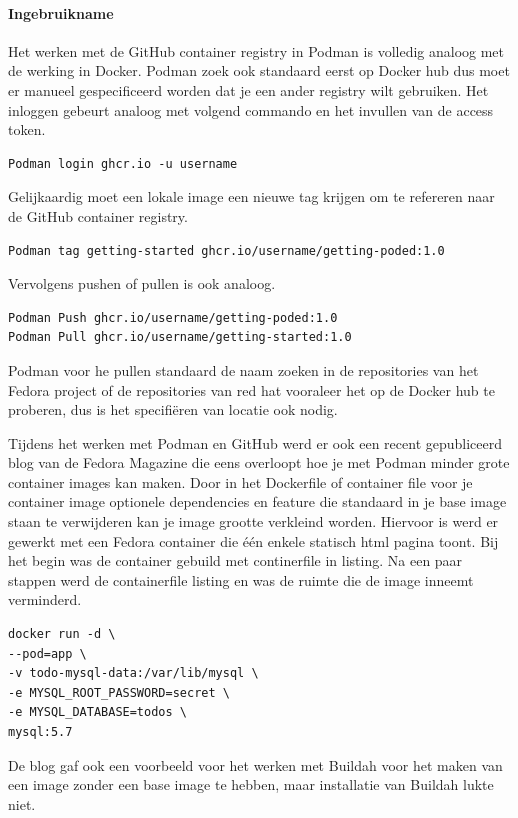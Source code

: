 \paragraph{Ingebruikname}
Het werken met de GitHub container registry in Podman is volledig analoog met de werking in Docker. Podman zoek ook standaard eerst op Docker hub dus moet er manueel gespecificeerd worden dat je een ander registry wilt gebruiken. Het inloggen gebeurt analoog met volgend commando en het invullen van de access token.
\begin{verbatim}
Podman login ghcr.io -u username
\end{verbatim}

Gelijkaardig moet een lokale image een nieuwe tag krijgen om te refereren naar de GitHub container registry.
\begin{verbatim}
Podman tag getting-started ghcr.io/username/getting-poded:1.0
\end{verbatim}

Vervolgens pushen of pullen is ook analoog.
\begin{verbatim}
Podman Push ghcr.io/username/getting-poded:1.0
Podman Pull ghcr.io/username/getting-started:1.0
\end{verbatim}

Podman voor he pullen standaard de naam zoeken in de repositories van het Fedora project of de repositories van red hat vooraleer het op de Docker hub te proberen, dus is het specifiëren van locatie ook nodig.

Tijdens het werken met Podman en GitHub werd er ook een recent gepubliceerd blog van de Fedora Magazine die eens overloopt hoe je met Podman minder grote container images kan maken. Door in het Dockerfile of container file voor je container image optionele dependencies en feature die standaard in je base image staan te verwijderen kan je image grootte verkleind worden. Hiervoor is werd er gewerkt met een Fedora container die één enkele statisch html pagina toont. Bij het begin was de container gebuild met continerfile in listing. Na een paar stappen werd de containerfile listing en was de ruimte die de image inneemt verminderd.
\begin{lstlisting}
docker run -d \
--pod=app \
-v todo-mysql-data:/var/lib/mysql \
-e MYSQL_ROOT_PASSWORD=secret \
-e MYSQL_DATABASE=todos \
mysql:5.7
\end{lstlisting}

De blog gaf ook een voorbeeld voor het werken met Buildah voor het maken van een image zonder een base image te hebben, maar installatie van Buildah lukte niet.

